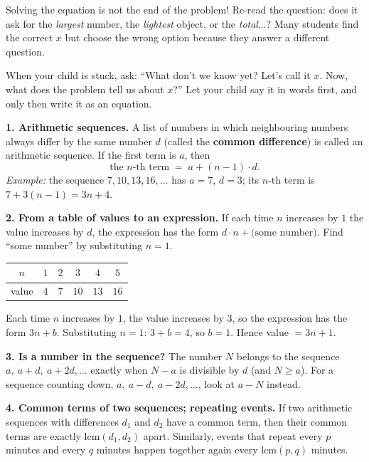 \begin{warnbox}
Solving the equation is not the end of the problem! Re-read the question: does it ask for the \emph{largest} number, the \emph{lightest} object, or the \emph{total}...?
Many students find the correct $x$ but choose the wrong option because they answer a different question.
\end{warnbox}

\begin{parentbox}
When your child is stuck, ask: ``What don't we know yet? Let's call it $x$. Now, what does the problem tell us about $x$?''
Let your child say it in words first, and only then write it as an equation.
\end{parentbox}

\begin{knowbox}
\textbf{1. Arithmetic sequences.} A list of numbers in which neighbouring numbers always differ by the same number $d$ (called the
\textbf{common difference}) is called an arithmetic sequence. If the first term is $a$, then
\[\text{the } n\text{-th term} \;=\; a+(n-1)\cdot d .\]
\emph{Example:} the sequence $7,10,13,16,\dots$ has $a=7$, $d=3$; its $n$-th term is $7+3(n-1)=3n+4$.

\textbf{2. From a table of values to an expression.} If each time $n$ increases by $1$ the value increases by $d$, the expression has the form
$d\cdot n+\text{(some number)}$. Find ``some number'' by substituting $n=1$.
\begin{center}
\begin{tabular}{|c|c|c|c|c|c|}
\hline
\rowcolor{tmBlue!10} $n$ & $1$ & $2$ & $3$ & $4$ & $5$\\ \hline
value & $4$ & $7$ & $10$ & $13$ & $16$\\ \hline
\end{tabular}
\end{center}
Each time $n$ increases by $1$, the value increases by $3$, so the expression has the form $3n+b$. Substituting $n=1$: $3+b=4$, so $b=1$. Hence value $=3n+1$.

\textbf{3. Is a number in the sequence?} The number $N$ belongs to the sequence $a,\ a+d,\ a+2d,\dots$ exactly when
$N-a$ is divisible by $d$ (and $N\ge a$). For a sequence counting down, $a,\ a-d,\ a-2d,\dots$, look at $a-N$ instead.

\textbf{4. Common terms of two sequences; repeating events.} If two arithmetic sequences with differences $d_1$ and $d_2$ have a common term, then
their common terms are exactly $\text{lcm}(d_1,d_2)$ apart. Similarly, events that repeat every $p$ minutes and every $q$ minutes
happen together again every $\text{lcm}(p,q)$ minutes.
\end{knowbox}

